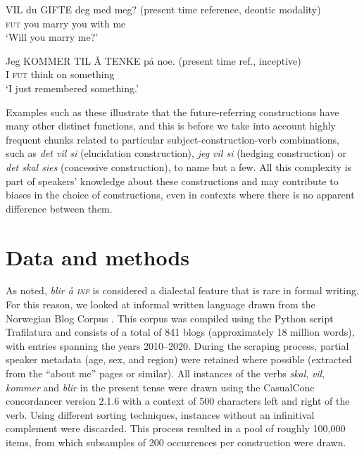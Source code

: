 \documentclass[output=paper,colorlinks,citecolor=brown]{langscibook}
\begin{document}
\ea\label{ex:06:8}
\gll VIL du GIFTE deg med meg? (present time reference, deontic modality)\\
     \textsc{fut} you marry you with me\\
\glt ‘Will you marry me?’
\z

\ea\label{ex:06:9}
\gll Jeg KOMMER TIL Å TENKE på noe. (present time ref., inceptive)\\
     I \textsc{fut} think on something\\
\glt ‘I just remembered something.’
\z

Examples such as these illustrate that the future-referring constructions have many other distinct functions, and this is before we take into account highly frequent chunks related to particular subject-construction-verb combinations, such as \textit{det vil si} (elucidation construction), \textit{jeg vil si} (hedging construction) or \textit{det skal sies} (concessive construction), to name but a few. All this complexity is part of speakers’ knowledge about these constructions and may contribute to biases in the choice of constructions, even in contexts where there is no apparent difference between them.

\section{Data and methods}\label{sec:06:3}
As noted, \textit{blir å \textsc{inf}} is considered a dialectal feature that is rare in formal writing. For this reason, we looked at informal written language drawn from the Norwegian Blog Corpus \citep{Mikkelsen2021}. This corpus was compiled using the Python script Trafilatura \citep{barbaresi2021} and consists of a total of 841 blogs (approximately 18 million words), with entries spanning the years 2010--2020. During the scraping process, partial speaker metadata (age, sex, and region) were retained where possible (extracted from the “about me” pages or similar). All instances of the verbs \textit{skal}, \textit{vil}, \textit{kommer} and \textit{blir} in the present tense were drawn using the CasualConc concordancer version 2.1.6 \citep{imao2021} with a context of 500 characters left and right of the verb. Using different sorting techniques, instances without an infinitival complement were discarded. This process resulted in a pool of roughly 100,000 items, from which subsamples of 200 occurrences per construction were drawn.
\end{document}

